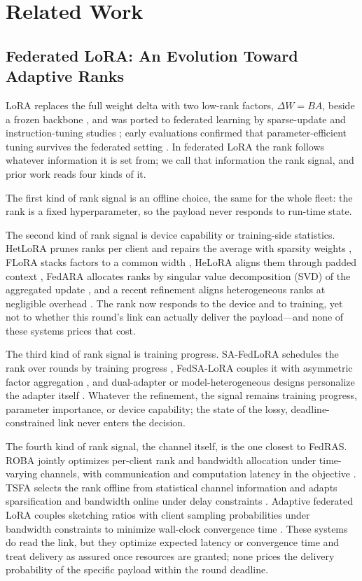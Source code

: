 \documentclass[a4paper,fleqn]{cas-dc}
\begin{document}
\section{Related Work}
\label{sec:related}
\subsection{Federated LoRA: An Evolution Toward Adaptive Ranks}
\label{sec:rwlora}
LoRA replaces the full weight delta with two low-rank factors, $\Delta W=BA$, beside a frozen backbone \cite{hu2022lora}, and was ported to federated learning by sparse-update and instruction-tuning studies \cite{babakniya2023slora,zhang2024fedit}; early evaluations confirmed that parameter-efficient tuning survives the federated setting \cite{zhang2023fedpetuning}. In federated LoRA the rank follows whatever information it is set from; we call that information the rank signal, and prior work reads four kinds of it.
\par
The first kind of rank signal is an offline choice, the same for the whole fleet: the rank is a fixed hyperparameter, so the payload never responds to run-time state.
\par
The second kind of rank signal is device capability or training-side statistics. HetLoRA prunes ranks per client and repairs the average with sparsity weights \cite{cho2024hetlora}, FLoRA stacks factors to a common width \cite{wang2024flora}, HeLoRA aligns them through padded context \cite{fan2025helora}, FedARA allocates ranks by singular value decomposition (SVD) of the aggregated update \cite{wu2026fedara}, and a recent refinement aligns heterogeneous ranks at negligible overhead \cite{byun2025fedlora}. The rank now responds to the device and to training, yet not to whether this round's link can actually deliver the payload---and none of these systems prices that cost.
\par
The third kind of rank signal is training progress. SA-FedLoRA schedules the rank over rounds by training progress \cite{yang2024safedlora}, FedSA-LoRA couples it with asymmetric factor aggregation \cite{guo2025fedsalora}, and dual-adapter or model-heterogeneous designs personalize the adapter itself \cite{yi2026pfedlora,yang2024feddpa}. Whatever the refinement, the signal remains training progress, parameter importance, or device capability; the state of the lossy, deadline-constrained link never enters the decision.
\par
The fourth kind of rank signal, the channel itself, is the one closest to FedRAS. ROBA jointly optimizes per-client rank and bandwidth allocation under time-varying channels, with communication and computation latency in the objective \cite{zou2025roba}. TSFA selects the rank offline from statistical channel information and adapts sparsification and bandwidth online under delay constraints \cite{kim2025tsfa}. Adaptive federated LoRA couples sketching ratios with client sampling probabilities under bandwidth constraints to minimize wall-clock convergence time \cite{hou2025aflora}. These systems do read the link, but they optimize expected latency or convergence time and treat delivery as assured once resources are granted; none prices the delivery probability of the specific payload within the round deadline.
\end{document}
